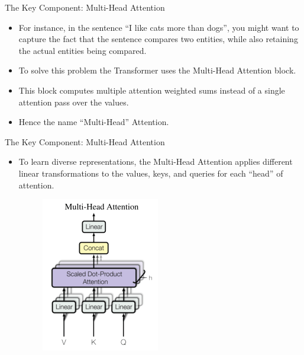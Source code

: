 \documentclass[handout]{beamer}
\begin{document}
\begin{frame}{The Key Component: Multi-Head Attention}
\begin{scriptsize}
\begin{itemize}
 \item For instance, in the sentence ``I like cats more than dogs'', you might want to capture the fact that the sentence compares two entities, while also retaining the actual entities being compared. 
 
 \item To solve this problem the Transformer uses the Multi-Head Attention block. 
 
 \item This block computes multiple attention weighted sums instead of a single attention pass over the values.
 
 \item Hence the name ``Multi-Head'' Attention.
 
 
 
\end{itemize}

\end{scriptsize}

\end{frame}


\begin{frame}{The Key Component: Multi-Head Attention}
\begin{scriptsize}
\begin{itemize}
 \item To learn diverse representations, the Multi-Head Attention applies different linear transformations to the values, keys, and queries for each “head” of attention.
 
 
     \begin{figure}[h]
        	\includegraphics[scale = 0.48]{pics/multi_head_attention.png}
        \end{figure}  
 

\end{itemize}

\end{scriptsize}

\end{frame}
\end{document}
